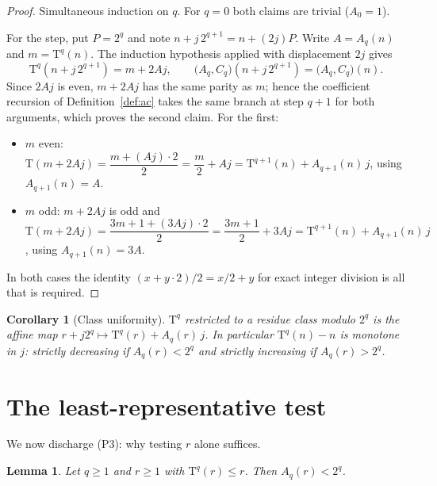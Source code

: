 \documentclass[11pt,a4paper]{article}
\theoremstyle{plain}
\newtheorem{lemma}[theorem]{Lemma}
\newtheorem{corollary}[theorem]{Corollary}
\theoremstyle{definition}
\newcommand{\Tmap}{\mathrm{T}}
\newcommand{\Acoef}{A}
\newcommand{\Ccoef}{C}
\begin{document}
\begin{proof}
Simultaneous induction on $q$. For $q=0$ both claims are trivial
($\Acoef_{0} = 1$).

For the step, put $P = 2^{q}$ and note $n + j\,2^{q+1} = n + (2j)P$. Write
$A = \Acoef_{q}(n)$ and $m = \Tmap^{q}(n)$. The induction hypothesis applied
with displacement $2j$ gives
\[
  \Tmap^{q}\!\left(n + j\,2^{q+1}\right) = m + 2Aj,
  \qquad
  \bigl(\Acoef_{q},\Ccoef_{q}\bigr)\!\left(n + j\,2^{q+1}\right)
    = \bigl(\Acoef_{q},\Ccoef_{q}\bigr)(n).
\]
Since $2Aj$ is even, $m + 2Aj$ has the same parity as $m$; hence the
coefficient recursion of Definition~\ref{def:ac} takes the same branch at
step $q+1$ for both arguments, which proves the second claim. For the first:
\begin{itemize}\itemsep2pt
\item $m$ even: $\Tmap(m + 2Aj) = \dfrac{m + (Aj)\cdot 2}{2}
      = \dfrac{m}{2} + Aj = \Tmap^{q+1}(n) + \Acoef_{q+1}(n)\,j$,
      using $\Acoef_{q+1}(n) = A$.
\item $m$ odd: $m + 2Aj$ is odd and
      $\Tmap(m + 2Aj) = \dfrac{3m + 1 + (3Aj)\cdot 2}{2}
      = \dfrac{3m+1}{2} + 3Aj = \Tmap^{q+1}(n) + \Acoef_{q+1}(n)\,j$,
      using $\Acoef_{q+1}(n) = 3A$.
\end{itemize}
In both cases the identity $\left(x + y\cdot 2\right)/2 = x/2 + y$ for exact
integer division is all that is required.
\end{proof}

\begin{corollary}[Class uniformity]\label{cor:uniform}
$\Tmap^{q}$ restricted to a residue class modulo $2^{q}$ is the affine map
$r + j2^{q} \mapsto \Tmap^{q}(r) + \Acoef_{q}(r)\,j$. In particular
$\Tmap^{q}(n) - n$ is monotone in $j$: strictly decreasing if
$\Acoef_{q}(r) < 2^{q}$ and strictly increasing if $\Acoef_{q}(r) > 2^{q}$.
\end{corollary}

\section{The least-representative test}
\label{sec:descent}

We now discharge (P3): why testing $r$ alone suffices.

\begin{lemma}\label{lem:Asmall}
Let $q \geq 1$ and $r \geq 1$ with $\Tmap^{q}(r) \leq r$. Then
$\Acoef_{q}(r) < 2^{q}$.
\end{lemma}
\end{document}
